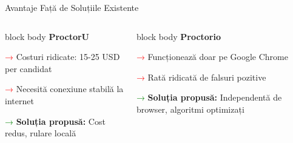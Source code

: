 \documentclass[aspectratio=169,9pt]{beamer}
\begin{document}
\begin{frame}{Avantaje Față de Soluțiile Existente}
        \vspace{-0.4cm}
        \begin{columns}[T]
                        \begin{beamercolorbox}[rounded=true,shadow=true,sep=0.7em]{block body}
                                \centering\textbf{\small ProctorU}
                                \vspace{0.1cm}
                                
                                \footnotesize
                                \textcolor{red}{→} Costuri ridicate: 15-25 USD per candidat
                                \vspace{0.1cm}
                                
                                \textcolor{red}{→} Necesită conexiune stabilă la internet
                                \vspace{0.1cm}
                                
                                \textcolor{green}{→} \textbf{Soluția propusă:} Cost redus, rulare locală
                        \end{beamercolorbox}
                        
                        \begin{beamercolorbox}[rounded=true,shadow=true,sep=0.7em]{block body}
                                \centering\textbf{\small Proctorio}
                                \vspace{0.1cm}
                                
                                \footnotesize
                                \textcolor{red}{→} Funcționează doar pe Google Chrome
                                \vspace{0.1cm}
                                
                                \textcolor{red}{→} Rată ridicată de falsuri pozitive
                                \vspace{0.1cm}
                                
                                \textcolor{green}{→} \textbf{Soluția propusă:} Independentă de browser, algoritmi optimizați
                        \end{beamercolorbox}
                        

\end{columns}
\end{frame}
\end{document}
